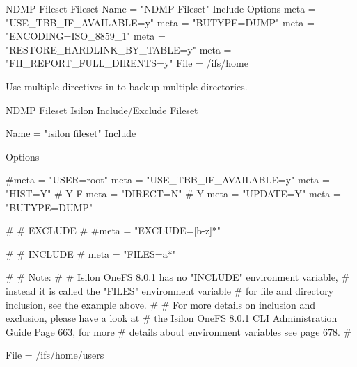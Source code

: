 \begin{bconfig}{NDMP Fileset}
Fileset {
  Name = "NDMP Fileset"
  Include {
    Options {
        meta = "USE_TBB_IF_AVAILABLE=y"
        meta = "BUTYPE=DUMP"
        meta = "ENCODING=ISO_8859_1"
        meta = "RESTORE_HARDLINK_BY_TABLE=y"
        meta = "FH_REPORT_FULL_DIRENTS=y"
    }
    File = /ifs/home
  }
}
\end{bconfig}

Use multiple  directives in  to backup multiple directories.



\begin{bconfig}{NDMP Fileset Isilon Include/Exclude}
Fileset {
  Name = "isilon fileset"
  Include {
    Options {
        #meta = "USER=root"
        meta = "USE_TBB_IF_AVAILABLE=y"
        meta = "HIST=Y" # Y F
        meta = "DIRECT=N" # Y
        meta = "UPDATE=Y"
        meta = "BUTYPE=DUMP"

        #
        # EXCLUDE
        #
        #meta = "EXCLUDE=[b-z]*"

        #
        # INCLUDE
        #
        meta = "FILES=a*"

        #
        # Note:
        #
        # Isilon OneFS 8.0.1 has no "INCLUDE" environment variable,
        # instead it is called the "FILES" environment variable
        # for file and directory inclusion, see the example above.
        #
        # For more details on inclusion and exclusion, please have a look at
        # the Isilon OneFS 8.0.1 CLI Administration Guide Page 663, for more
        # details about environment variables see page 678.
        #
    }
    File = /ifs/home/users
  }
}
\end{bconfig}


